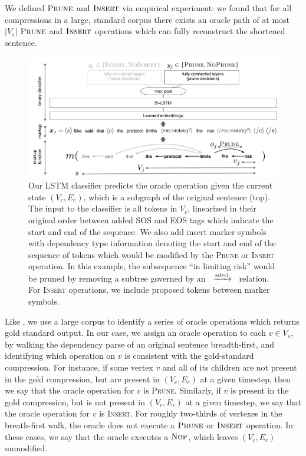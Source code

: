 \documentclass[11pt,a4paper]{article}
\newcommand{\rdep}[1]{\ $\xrightarrow{\text{\tiny #1}}$\ }
\begin{document}
We defined $\textsc{Prune}$ and $\textsc{Insert}$ via empirical experiment: we found that for all compressions in a large, standard  corpus \cite{filippova2013overcoming} there exists an oracle path of at most $|V_s|$ $\textsc{Prune}$ and $\textsc{Insert}$ operations which can fully reconstruct the shortened sentence. 

\begin{figure}[htb!]
\centering
\includegraphics[width=.75\textwidth]{example.pdf}
\caption{Our LSTM classifier predicts the oracle operation given the current state $(V_c, E_c)$, which is a subgraph of the original sentence (top). The input to the classifier is all tokens in $V_c$,  linearized in their original order between added SOS and EOS tags which indicate the start and end of the sequence. We also add insert marker symbols with dependency type information denoting the start and end of the sequence of tokens which would be modified by the \textsc{Prune} or \textsc{Insert} operation. In this example, the subsequence ``in limiting risk'' would be pruned by removing a subtree governed by an \rdep{advcl} relation. For \textsc{Insert} operations, we include proposed tokens between marker symbols.}
\label{f:example}
\end{figure}

Like \citet{D14-1082}, we use a large corpus to identify a series of oracle operations which returns gold standard output. In our case, we assign an oracle operation to each $v \in V_s$, by walking the dependency parse of an original sentence breadth-first, and identifying which operation on $v$ is consistent with the gold-standard compression. For instance, if some vertex $v$ and all of its children are not present in the gold compression, but are present in ${(V_c,E_c)}$ at a given timestep, then we say that the oracle operation for $v$ is \textsc{Prune}. Similarly, if $v$ is present in the gold compression, but is not present in ${(V_c,E_c)}$ at a given timestep, we say that the oracle operation for $v$ is \textsc{Insert}. For roughly two-thirds of vertexes in the breath-first walk, the oracle does not execute a $\textsc{Prune}$ or $\textsc{Insert}$ operation. In these cases, we say that the oracle executes a $\textsc{Nop}$, which leaves ${(V_c,E_c)}$ unmodified. 
\end{document}

